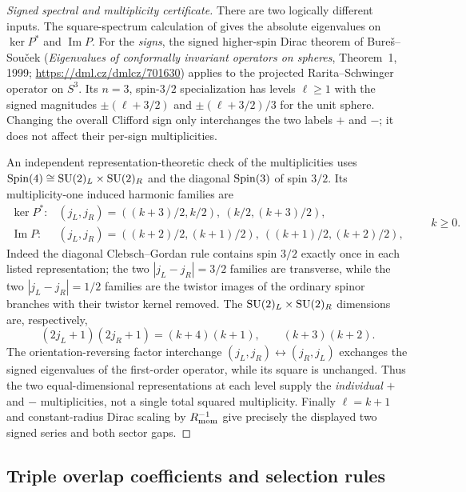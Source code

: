 \documentclass[11pt]{article}
\begin{document}
\begin{proof}[Signed spectral and multiplicity certificate]
There are two logically different inputs.  The square-spectrum
calculation of \cite{HommaTomihisa2020RaritaSchwinger} gives the
absolute eigenvalues on $\ker P^*$ and $\operatorname{Im}P$.
For the \emph{signs}, the signed higher-spin Dirac theorem of
Bure\v{s}--Sou\v{c}ek (\emph{Eigenvalues of conformally invariant
operators on spheres}, Theorem~1, 1999;
\url{https://dml.cz/dmlcz/701630}) applies to the projected
Rarita--Schwinger operator on $S^3$.  Its $n=3$, spin-$3/2$ specialization
has levels $\ell\ge1$ with the signed magnitudes
$\pm(\ell+3/2)$ and $\pm(\ell+3/2)/3$ for the unit sphere.
Changing the overall Clifford sign only interchanges the two labels
$+$ and $-$; it does not affect their per-sign multiplicities.

An independent representation-theoretic check of the multiplicities
uses $\mathrm{Spin}(4)\cong\mathrm{SU}(2)_L\times\mathrm{SU}(2)_R$ and the diagonal
$\mathrm{Spin}(3)$ of spin $3/2$.  Its multiplicity-one induced harmonic
families are
\[
 \begin{array}{ll}
 \ker P^*: &(j_L,j_R)=((k+3)/2,k/2),\ (k/2,(k+3)/2),\\
 \operatorname{Im}P: &(j_L,j_R)=((k+2)/2,(k+1)/2),\
                              ((k+1)/2,(k+2)/2),
 \end{array}\qquad k\ge0.
\]
Indeed the diagonal Clebsch--Gordan rule contains spin $3/2$
exactly once in each listed representation; the two $|j_L-j_R|=3/2$
families are transverse, while the two $|j_L-j_R|=1/2$ families are
the twistor images of the ordinary spinor branches with their twistor
kernel removed.  The $\mathrm{SU}(2)_L\times\mathrm{SU}(2)_R$ dimensions are,
respectively,
\[
 (2j_L+1)(2j_R+1)=(k+4)(k+1),\qquad (k+3)(k+2).
\]
The orientation-reversing factor interchange $(j_L,j_R)\leftrightarrow
(j_R,j_L)$ exchanges the signed eigenvalues of the first-order
operator, while its square is unchanged.  Thus the two equal-dimensional
representations at each level supply the \emph{individual} $+$ and $-$
multiplicities, not a single total squared multiplicity.  Finally
$\ell=k+1$ and constant-radius Dirac scaling by $R_{\mathrm{mom}}^{-1}$
give precisely the displayed two signed series and both sector gaps.
\end{proof}

\subsection{Triple overlap coefficients and selection rules}
\label{p1:subsec:s3-triple-products}
\end{document}
